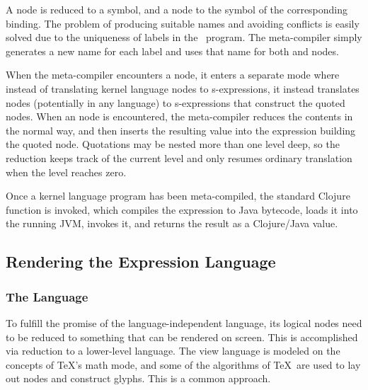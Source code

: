 A  node is reduced to a symbol, and a  node to the symbol of the corresponding binding. The problem of producing suitable names and avoiding conflicts is easily solved due to the uniqueness of labels in the \Meta\ program. The meta-compiler simply generates a new name for each label and uses that name for both  and  nodes.

When the meta-compiler encounters a  node, it enters a separate mode where instead of translating kernel language nodes to s-expressions, it instead translates nodes (potentially in any language) to s-expressions that construct the quoted nodes. When an  node is encountered, the meta-compiler reduces the contents in the normal way, and then inserts the resulting value into the expression building the quoted node. Quotations may be nested more than one level deep, so the reduction keeps track of the current level and only resumes ordinary translation when the level reaches zero. 


Once a kernel language program has been meta-compiled, the standard Clojure function  is invoked, which compiles the expression to Java bytecode, loads it into the running JVM, invokes it, and returns the result as a Clojure/Java value. %





%
%
\subsection{Rendering the Expression Language}

\subsubsection{The  Language}
To fulfill the promise of the language-independent  language, its logical nodes need to be reduced to something that can be rendered on screen. This is accomplished via reduction to a lower-level  language. The view language is modeled on the concepts of \TeX's math mode\cite{tex-math}, and some of the algorithms of \TeX\ are used to lay out nodes and construct glyphs. This is a common approach\cite{mathml}.

